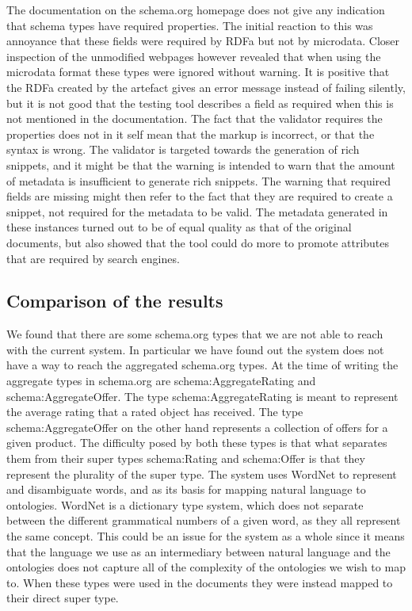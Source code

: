 The documentation on the schema.org homepage does not give any indication that schema types have required properties.
The initial reaction to this was annoyance that these fields were required by RDFa but not by microdata.
Closer inspection of the unmodified webpages however revealed that when using the microdata format these types
were ignored without warning.
It is positive that the RDFa created by the artefact gives an error message instead of failing silently,
but it is not good that the testing tool describes a field as required when this is not mentioned in the documentation.
The fact that the validator requires the properties does not in it self mean that the markup is incorrect,
or that the syntax is wrong.
The validator is targeted towards the generation of rich snippets,
and it might be that the warning is intended to warn that the amount of metadata is insufficient to generate rich snippets.
The warning that required fields are missing might then refer to the fact that they are required to create a snippet,
not required for the metadata to be valid.
The metadata generated in these instances turned out to be of equal quality as that of the original documents,
but also showed that the tool could do more to promote attributes that are required by search engines.

\subsection{Comparison of the results}
We found that there are some schema.org types that we are not able to reach with the current system.
In particular we have found out the system does not have a way to reach the aggregated schema.org types.
At the time of writing the aggregate types in schema.org are schema:AggregateRating and schema:AggregateOffer.
The type schema:AggregateRating is meant to represent the average rating that a rated object has received.
The type schema:AggregateOffer on the other hand represents a collection of offers for a given product.
The difficulty posed by both these types is that what separates them from their super types schema:Rating and schema:Offer
is that they represent the plurality of the super type.
The system uses WordNet to represent and disambiguate words, and as its basis for mapping natural language to ontologies.
WordNet is a dictionary type system, which does not separate between the different grammatical numbers of a given word,
as they all represent the same concept.
This could be an issue for the system as a whole since it means that the language we use as an intermediary between natural language
and the ontologies does not capture all of the complexity of the ontologies we wish to map to.
When these types were used in the documents they were instead mapped to their direct super type.

